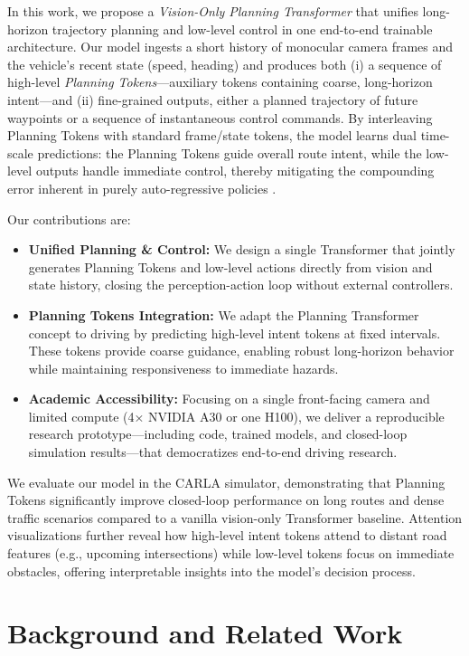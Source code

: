\documentclass[11pt,a4paper]{article}
\begin{document}
In this work, we propose a \emph{Vision-Only Planning Transformer} that unifies long-horizon trajectory planning and low-level control in one end-to-end trainable architecture. Our model ingests a short history of monocular camera frames and the vehicle's recent state (speed, heading) and produces both (i) a sequence of high-level \emph{Planning Tokens}—auxiliary tokens containing coarse, long-horizon intent—and (ii) fine-grained outputs, either a planned trajectory of future waypoints or a sequence of instantaneous control commands. By interleaving Planning Tokens with standard frame/state tokens, the model learns dual time-scale predictions: the Planning Tokens guide overall route intent, while the low-level outputs handle immediate control, thereby mitigating the compounding error inherent in purely auto-regressive policies \cite{Clinton2024planning}.

Our contributions are:
\begin{itemize}
    \item \textbf{Unified Planning \& Control:} We design a single Transformer that jointly generates Planning Tokens and low-level actions directly from vision and state history, closing the perception-action loop without external controllers.
    \item \textbf{Planning Tokens Integration:} We adapt the Planning Transformer concept to driving by predicting high-level intent tokens at fixed intervals. These tokens provide coarse guidance, enabling robust long-horizon behavior while maintaining responsiveness to immediate hazards.
    \item \textbf{Academic Accessibility:} Focusing on a single front-facing camera and limited compute (4× NVIDIA A30 or one H100), we deliver a reproducible research prototype—including code, trained models, and closed-loop simulation results—that democratizes end-to-end driving research.
\end{itemize}

We evaluate our model in the CARLA simulator, demonstrating that Planning Tokens significantly improve closed-loop performance on long routes and dense traffic scenarios compared to a vanilla vision-only Transformer baseline. Attention visualizations further reveal how high-level intent tokens attend to distant road features (e.g., upcoming intersections) while low-level tokens focus on immediate obstacles, offering interpretable insights into the model's decision process.

\section*{Background and Related Work}
\end{document}
